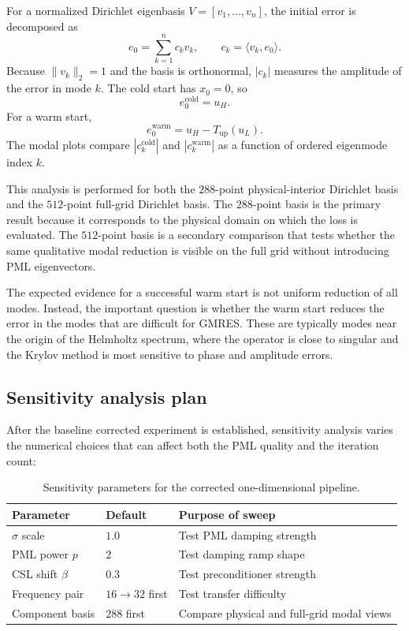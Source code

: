 For a normalized Dirichlet eigenbasis $V = [v_1,\ldots,v_n]$, the initial
error is decomposed as
\begin{equation}
    e_0 = \sum_{k=1}^{n} c_k v_k,
    \qquad
    c_k = \langle v_k, e_0 \rangle.
    \label{eq:oned_component_weighting}
\end{equation}
Because $\|v_k\|_2=1$ and the basis is orthonormal, $|c_k|$ measures the
amplitude of the error in mode $k$. The cold start has $x_0=0$, so
\[
    e_0^{\mathrm{cold}} = u_H.
\]
For a warm start,
\[
    e_0^{\mathrm{warm}} = u_H - T_{\mathrm{up}}(u_L).
\]
The modal plots compare $|c_k^{\mathrm{cold}}|$ and
$|c_k^{\mathrm{warm}}|$ as a function of ordered eigenmode index $k$.

This analysis is performed for both the $288$-point physical-interior
Dirichlet basis and the $512$-point full-grid Dirichlet basis. The $288$-point
basis is the primary result because it corresponds to the physical domain on
which the loss is evaluated. The $512$-point basis is a secondary comparison
that tests whether the same qualitative modal reduction is visible on the full
grid without introducing PML eigenvectors.

The expected evidence for a successful warm start is not uniform reduction of
all modes. Instead, the important question is whether the warm start reduces
the error in the modes that are difficult for GMRES. These are typically modes
near the origin of the Helmholtz spectrum, where the operator is close to
singular and the Krylov method is most sensitive to phase and amplitude errors.


\subsection{Sensitivity analysis plan}
\label{subsec:methodology_1d_sensitivity}

After the baseline corrected experiment is established, sensitivity analysis
varies the numerical choices that can affect both the PML quality and the
iteration count:
\begin{table}[h]
\centering
\begin{tabular}{lll}
\toprule
Parameter & Default & Purpose of sweep \\
\midrule
$\sigma$ scale & $1.0$ & Test PML damping strength \\
PML power $p$ & $2$ & Test damping ramp shape \\
CSL shift $\beta$ & $0.3$ & Test preconditioner strength \\
Frequency pair & $16\to32$ first & Test transfer difficulty \\
Component basis & $288$ first & Compare physical and full-grid modal views \\
\bottomrule
\end{tabular}
\caption{Sensitivity parameters for the corrected one-dimensional pipeline.}
\label{tab:oned_sensitivity_parameters}
\end{table}

